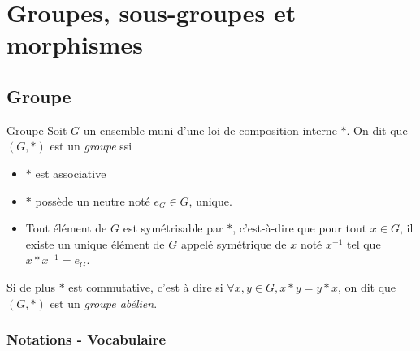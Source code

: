 
\section{Groupes, sous-groupes et morphismes }
\subsection{Groupe}

\begin{definition}{Groupe}{}
    Soit $G$ un ensemble muni d'une loi de composition interne $\ast$. 
    On dit que $(G, \ast)$ est un \emph{groupe} ssi 
    \begin{itemize}
        \item $\ast$ est associative
        \item $\ast$ possède un neutre noté $e_G \in G$, unique.
        \item Tout élément de $G$ est symétrisable par $\ast$, c'est-à-dire que pour tout $x \in G$, 
        il existe un unique élément de $G$ appelé symétrique de $x$ noté $x^{-1}$ tel que $x \ast x^{-1} = e_G$.
    \end{itemize}

    Si de plus $\ast$ est commutative, c'est à dire si $\forall x, y \in G, x \ast y = y \ast x$, 
    on dit que $(G, \ast)$ est un \emph{groupe abélien}.
\end{definition}


\subsubsection{Notations - Vocabulaire }

